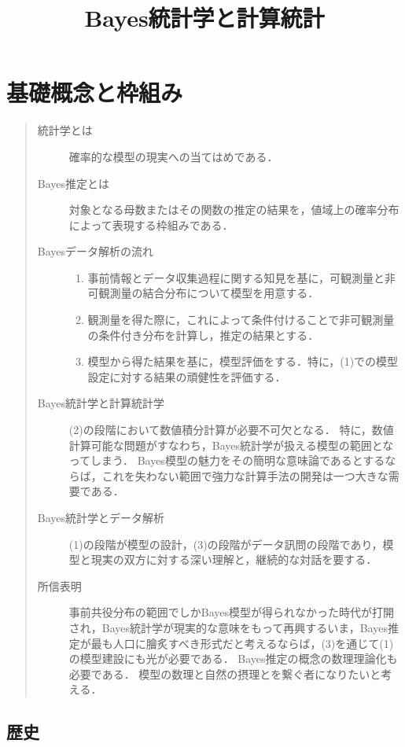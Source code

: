 \documentclass[uplatex,dvipdfmx]{jsreport}
\title{Bayes統計学と計算統計}
\author{}
\begin{document}
\tableofcontents

\chapter{基礎概念と枠組み}

\begin{quote}
    \begin{description}
        \item[統計学とは] 確率的な模型の現実への当てはめである．
        \item[Bayes推定とは] 対象となる母数またはその関数の推定の結果を，値域上の確率分布によって表現する枠組みである．
        \item[Bayesデータ解析の流れ] \mbox{}
        \begin{enumerate}[({B}1)]
            \item 事前情報とデータ収集過程に関する知見を基に，可観測量と非可観測量の結合分布について模型を用意する．
            \item 観測量を得た際に，これによって条件付けることで非可観測量の条件付き分布を計算し，推定の結果とする．
            \item 模型から得た結果を基に，模型評価をする．特に，(1)での模型設定に対する結果の頑健性を評価する．
        \end{enumerate}
        \item[Bayes統計学と計算統計学] (2)の段階において数値積分計算が必要不可欠となる．
        特に，数値計算可能な問題がすなわち，Bayes統計学が扱える模型の範囲となってしまう．
        Bayes模型の魅力をその簡明な意味論であるとするならば，これを失わない範囲で強力な計算手法の開発は一つ大きな需要である．
        \item[Bayes統計学とデータ解析] (1)の段階が模型の設計，(3)の段階がデータ訊問の段階であり，模型と現実の双方に対する深い理解と，継続的な対話を要する．
        \item[所信表明] 事前共役分布の範囲でしかBayes模型が得られなかった時代が打開され，Bayes統計学が現実的な意味をもって再興するいま，Bayes推定が最も人口に膾炙すべき形式だと考えるならば，(3)を通じて(1)の模型建設にも光が必要である．
        Bayes推定の概念の数理理論化も必要である．
        模型の数理と自然の摂理とを繋ぐ者になりたいと考える．
    \end{description}
\end{quote}

\section{歴史}
\end{document}

